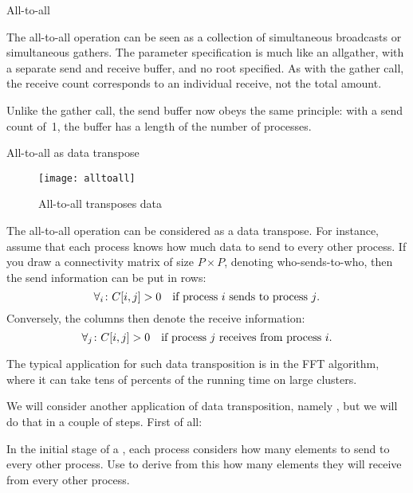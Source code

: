 
 {All-to-all}
\label{sec:alltoall}

The all-to-all operation
%
%
can be seen as a collection of simultaneous
broadcasts or simultaneous gathers. The parameter specification is much
like an allgather, with a separate send and receive buffer, and no
root specified. As with the gather call, the receive count corresponds
to an individual receive, not the total amount.

Unlike the gather call, the send buffer now obeys the same principle:
with a send count of~1, the buffer has a length of the number of
processes.

 {All-to-all as data transpose}
\label{sec:alltoall-transpose}

\begin{figure}[ht]
  \texttt{[image: alltoall]}
  \caption{All-to-all transposes data}
  \label{fig:alltoall}
\end{figure}

The all-to-all operation can be considered as a data transpose. For
instance, assume that each process knows how much data to send to
every other process. If you draw a connectivity matrix of size $P\times P$,
denoting who-sends-to-who, then the send information can be put in
rows:
\[ \forall_i\colon C[i,j]>0\quad\hbox{if process $i$ sends to process $j$}. \]
Conversely, the columns then denote the receive information:
\[ \forall_j\colon C[i,j]>0\quad\hbox{if process $j$ receives from process $i$}. \]

The typical application for such data transposition is in the \ac{FFT}
algorithm, where it can take tens of percents of the running time on
large clusters.

We will consider
another application of data transposition, namely ,
but we will do that in a couple of steps. First of all:

\begin{exercise}
  \label{ex:radixsort1}
  In the initial stage of a , each process
  considers how many elements to send to every other process.
  Use  to derive from this how many
  elements they will receive from every other process.
\end{exercise}

